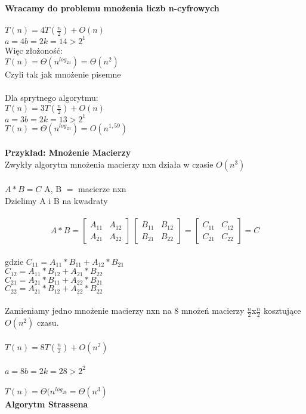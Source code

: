\textbf{Wracamy do problemu mnożenia liczb n-cyfrowych}\\
\\
$T(n) = 4T(\frac{n}{2}) + O(n)$\\
$a=4$\tab $b=2$\tab $k=1$\tab $4>2^1$\\
Więc złożoność:\\
\tab$T(n) = \Theta(n^{log_24})=\Theta(n^2)$\\
Czyli tak jak mnożenie pisemne\\
\\
Dla sprytnego algorytmu: \\
\tab $T(n) = 3T(\frac{n}{2})+O(n)$\\
$a=3$\tab $b=2$\tab $k=1$\tab $3>2^1$\\
$T(n)= \Theta(n^{log_23})=O(n^{1,59})$\\
\\
\textbf{Przykład: Mnożenie Macierzy}\\
Zwykły algorytm mnożenia macierzy nxn działa w czasie $O(n^3)$\\
\\
$A\ast B=C$ A, B $=$ macierze nxn\\
Dzielimy A i B na kwadraty\\
\\
\[
A\ast B = 
\begin{bmatrix}
    A_{11}       & A_{12} \\
    A_{21}       & A_{22} 
\end{bmatrix}\ 
\begin{bmatrix}
    B_{11}       & B_{12} \\
    B_{21}       & B_{22} 
\end{bmatrix}
=
\begin{bmatrix}
    C_{11}       & C_{12} \\
    C_{21}       & C_{22} 
\end{bmatrix} = C
\]
\\
gdzie $C_{11}= A_{11}\ast B_{11}+A_{12}\ast B_{21}$\\
\tab $C_{12}= A_{11}\ast B_{12}+A_{21}\ast B_{22}$\\
\tab $C_{21}= A_{21}\ast B_{11}+A_{22}\ast B_{21}$\\
\tab $C_{22}= A_{21}\ast B_{12}+A_{22}\ast B_{22}$\\
\\
Zamieniamy jedno mnożenie macierzy nxn na 8 mnożeń macierzy $\frac{n}{2}$x$\frac{n}{2}$ kosztujące $O(n^2)$ czasu.\\
\\
\tab $T(n)=8T( \frac{n}{2} )+ O(n^2)$\\
\\
$a=8$\tab $b=2$\tab $k=2$\tab $8>2^2$\\
\\
\tab $T(n)=\Theta(n^{log_28} = \Theta(n^3)$\\

\textbf{Algorytm Strassena}